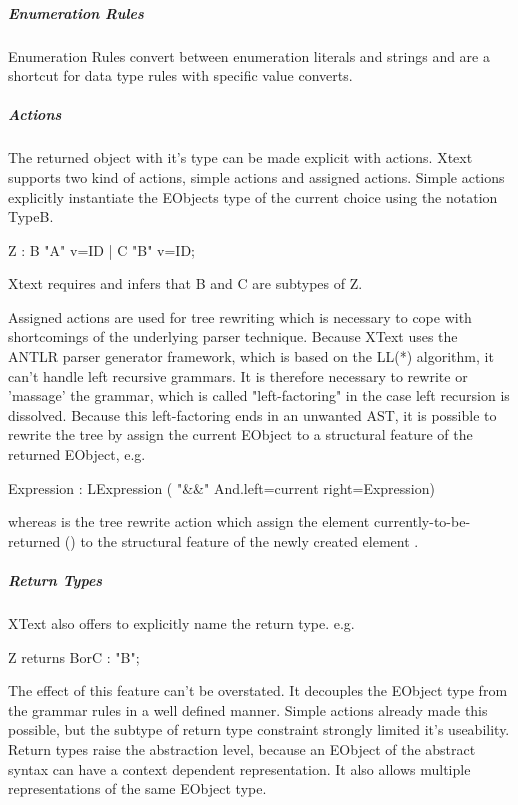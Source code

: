 \subparagraph{Enumeration Rules}
Enumeration Rules convert between enumeration literals and strings and are a shortcut for data type rules with specific value converts.

\subparagraph{Actions}
The returned object with it's type can be made explicit with actions. Xtext supports two kind of actions, simple actions and assigned actions. Simple actions explicitly instantiate the EObjects type of the current choice using the notation {TypeB}.
\begin{xtxt}
Z 	: 	{B} "A" v=ID
	| 	{C} "B" v=ID;
\end{xtxt}
Xtext requires and infers that B and C are subtypes of Z. 

Assigned actions are used for tree rewriting which is necessary to cope with shortcomings of the underlying parser technique. Because XText uses the ANTLR parser generator framework, which is based on the LL(*) algorithm, it can't handle left recursive grammars. It is therefore necessary to rewrite or 'massage' the grammar, which is called "left-factoring" in the case left recursion is dissolved. Because this left-factoring ends in an unwanted AST, it is possible to rewrite the tree by assign the current EObject to a structural feature of the returned EObject, e.g. 
\begin{xtxt}
Expression 	: 	LExpression 
	 	( "&&" {And.left=current}  right=Expression)
\end{xtxt}
whereas  is the tree rewrite action which assign the element currently-to-be-returned () to the structural feature  of the newly created element .

\subparagraph{Return Types}
XText also offers to explicitly name the return type. e.g.
\begin{xtxt}
Z returns BorC	: "B";
\end{xtxt}
The effect of this feature can't be overstated.  It decouples the EObject type from the grammar rules in a well defined manner. Simple actions already made this possible, but the subtype of return type constraint strongly limited it's useability. Return types raise the abstraction level, because an EObject of the abstract syntax can have a context dependent representation. It also allows multiple representations of the same EObject type.

